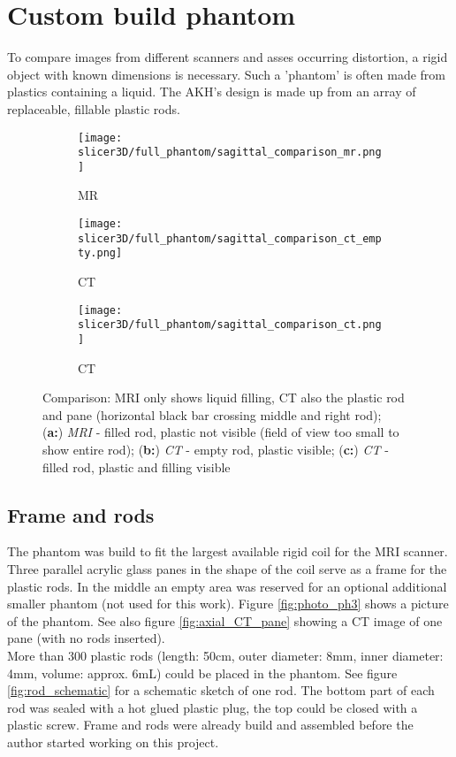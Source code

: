 \section{Custom build phantom}

To compare images from different scanners and asses occurring distortion, a rigid object with known dimensions is necessary.
Such a 'phantom' is often made from plastics containing a liquid.
The AKH's design is made up from an array of replaceable, fillable plastic rods.

\begin{figure}[!htb]
\centering
  \begin{subfigure}[b]{0.1\textwidth}
    \texttt{[image: slicer3D/full\_phantom/sagittal\_comparison\_mr.png]}
    \caption{MR}
    \label{fig:sagittal_comparison_mr}
  \end{subfigure}
  \begin{subfigure}[b]{0.1\textwidth}
    \texttt{[image: slicer3D/full\_phantom/sagittal\_comparison\_ct\_empty.png]}
    \caption{CT}
    \label{fig:sagittal_comparison_ct_empty}
  \end{subfigure}
  \begin{subfigure}[b]{0.1\textwidth}
    \texttt{[image: slicer3D/full\_phantom/sagittal\_comparison\_ct.png]}
    \caption{CT}
    \label{fig:sagittal_comparison_ct}
  \end{subfigure}
  \caption{Comparison: MRI only shows liquid filling, CT also the plastic rod and pane (horizontal black bar crossing middle and right rod);\\ (\textbf{a:}) \textit{MRI} - filled rod, plastic not visible (field of view too small to show entire rod); (\textbf{b:}) \textit{CT} - empty rod, plastic visible; (\textbf{c:}) \textit{CT} - filled rod, plastic and filling visible}
  \label{fig:sagittal_comparison}
\end{figure}

\subsection{Frame and rods}

The phantom was build to fit the largest available rigid coil for the MRI scanner.
Three parallel acrylic glass panes in the shape of the coil serve as a frame for the plastic rods.
In the middle an empty area was reserved for an optional additional smaller phantom (not used for this work).
Figure \ref{fig:photo_ph3} shows a picture of the phantom. See also figure \ref{fig:axial_CT_pane} showing a CT image of one pane (with no rods inserted). \\
More than 300 plastic rods (length: 50cm, outer diameter: 8mm, inner diameter: 4mm, volume: approx. 6mL) could be placed in the phantom.
See figure \ref{fig:rod_schematic} for a schematic sketch of one rod.
The bottom part of each rod was sealed with a hot glued plastic plug, the top could be closed with a plastic screw.
Frame and rods were already build and assembled before the author started working on this project.

